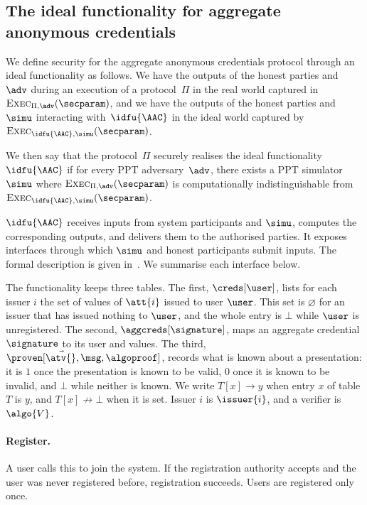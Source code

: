 \subsection{The ideal functionality for aggregate anonymous credentials}

We define security for the aggregate anonymous credentials protocol through an
ideal functionality as follows. We have the outputs of the honest parties
and~$\adv$ during an execution of a protocol~$\Pi$ in the real world captured in
$\textsc{Exec}_{\Pi,\adv}(\secparam)$, and we have the outputs of the honest
parties and~$\simu$ interacting with~$\idfu{\AAC}$ in the ideal world captured
by $\textsc{Exec}_{\idfu{\AAC},\simu}(\secparam)$.

We then say that the protocol~$\Pi$ securely realises the ideal
functionality~$\idfu{\AAC}$ if for every PPT adversary~$\adv$, there exists a
PPT simulator~$\simu$ where $\textsc{Exec}_{\Pi,\adv}(\secparam)$ is
computationally indistinguishable from
$\textsc{Exec}_{\idfu{\AAC},\simu}(\secparam)$.

$\idfu{\AAC}$ receives inputs from system participants and $\simu$, computes the
corresponding outputs, and delivers them to the authorised parties. It exposes
interfaces through which $\simu$ and honest participants submit inputs.  The
formal description is given in~. We summarise each
interface below.

The functionality keeps three tables. The first, $\creds[\user]$, lists for
each issuer $i$ the set of values of $\att{i}$ issued to user $\user$. This set
is $\varnothing$ for an issuer that has issued nothing to $\user$, and the whole
entry is $\bot$ while $\user$ is unregistered. The second,
$\aggcreds[\signature]$, maps an aggregate credential $\signature$ to its user
and values. The third, $\proven[\vec{\atv{}}, \msg, \algoproof]$, records what
is known about a presentation: it is $1$ once the presentation is known to be
valid, $0$ once it is known to be invalid, and $\bot$ while neither is known. We
write $T[x] \rightarrow y$ when entry $x$ of table $T$ is $y$, and $T[x]
\not\rightarrow \bot$ when it is set. Issuer $i$ is $\issuer{i}$, and a verifier
is $\algo{V}$.

\paragraph{Register.} A user calls this to join the system. If the registration
authority accepts and the user was never registered before, registration
succeeds. Users are registered only once.

